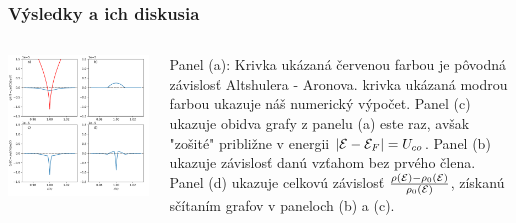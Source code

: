 \documentclass[
	11pt, %
]{beamer}
\begin{document}
\begin{frame}
\frametitle{Výsledky a ich diskusia}
\begin{columns}[c]

\begin{column}{.5\textwidth}
\includegraphics[scale=0.35]{grafy/plot_tau_1_c_1}
\end{column}
\begin{column}{.5\textwidth}
\small
Panel (a): Krivka ukázaná červenou farbou je pôvodná závislosť Altshulera - Aronova.
krivka ukázaná modrou farbou ukazuje náš numerický výpočet. Panel (c) ukazuje obidva grafy z panelu (a) este raz, avšak "zošité" približne v energii  $|\mathcal{E}-\mathcal{E}_F| = U_{co}$. Panel (b) ukazuje závislosť danú vzťahom bez prvého člena. Panel (d) ukazuje celkovú závislosť $\frac{\rho(\mathcal{E}) - \rho_0(\mathcal{E})}{\rho_0(\mathcal{E})}$, získanú sčítaním grafov v paneloch (b) a (c).
\normalsize
\end{column}

\end{columns}
\end{frame}
\end{document}
